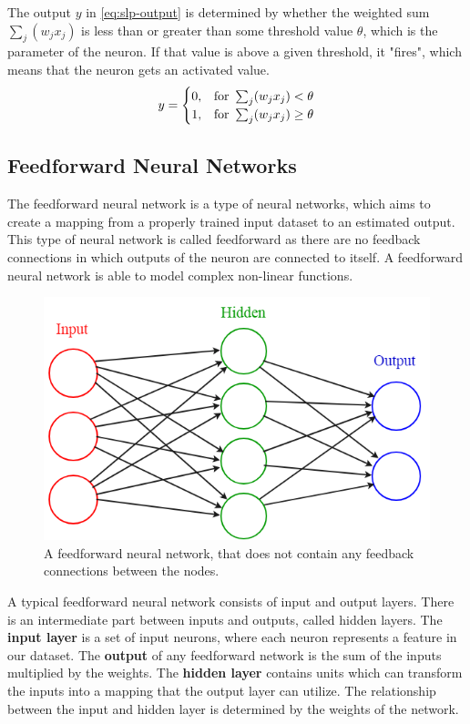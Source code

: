 The output $y$ in \autoref{eq:slp-output} is determined by whether the weighted sum $\sum_j(w_j x_j)$ is less than or greater than some threshold value $\theta$, which is the parameter of the neuron. If that value is above a given threshold, it "fires", which means that the neuron gets an activated value. 
\begin{equation} y = \begin{cases} 0, & \hbox{for}~ \sum_j(w_j x_j) < \theta \\ 1, & \hbox{for}~ \sum_j(w_j x_j) \geq \theta \end{cases} \label{eq:slp-output} \end{equation} 

\newpage

\subsection{Feedforward Neural Networks}

The feedforward neural network \cite{fine2006feedforward} is a type of neural networks, which aims to create a mapping from a properly trained input dataset to an estimated output. This type of neural network is called feedforward as there are no feedback connections in which outputs of the neuron are connected to itself. A feedforward neural network is able to model complex non-linear functions. 

\begin{figure}[h]
	\centering
	\includegraphics[height=0.35\linewidth]{./figures/feedforward}
	\caption{A feedforward neural network, that does not contain any feedback connections between the nodes.}
	\label{fig:feedforward}
\end{figure}

A typical feedforward neural network consists of input and output layers. There is an intermediate part between inputs and outputs, called hidden layers. The \textbf{input layer} is a set of input neurons, where each neuron represents a feature in our dataset. The \textbf{output} of any feedforward network is the sum of the inputs multiplied by the weights. The \textbf{hidden layer} contains units which can transform the inputs into a mapping that the output layer can utilize. The relationship between the input and hidden layer is determined by the weights of the network. \bigskip

